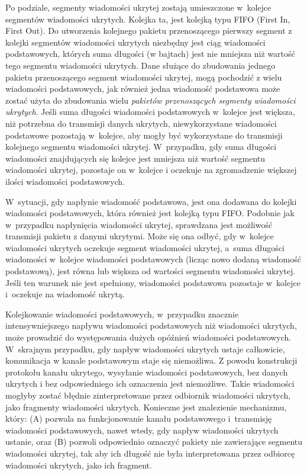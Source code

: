 \documentclass[a4paper, twoside, openright, 12pt]{report}
\begin{document}
    Po podziale, segmenty wiadomości ukrytej zostają umieszczone w~kolejce segmentów wiadomości
    ukrytych. Kolejka ta, jest kolejką typu FIFO (First In, First Out).
    Do utworzenia kolejnego pakietu przenoszącego pierwszy segment z kolejki
    segmentów wiadomości ukrytych niezbędny jest ciąg wiadomości podstawowych,
    których suma długości (w bajtach) jest nie mniejsza niż wartość tego segmentu wiadomości ukrytych.
    Dane służące do zbudowania
    jednego pakietu przenoszącego segment wiadomości ukrytej, mogą pochodzić z wielu wiadomości
    podstawowych, jak również jedna wiadomość podstawowa może zostać użyta do zbudowania
    wielu \emph{pakietów przenoszących segmenty wiadomości ukrytych}. Jeśli suma długości wiadomości
    podstawowych w~kolejce jest większa, niż potrzebna do transmisji danych ukrytych, niewykorzystane
    wiadomości podstawowe pozostają w~kolejce, aby mogły być wykorzystane do transmisji
    kolejnego segmentu wiadomości ukrytej.
    W~przypadku, gdy suma długości wiadomości znajdujących się kolejce jest mniejsza
    niż wartość segmentu wiadomości ukrytej, pozostaje on w~kolejce i oczekuje
    na zgromadzenie większej ilości wiadomości podstawowych.

    W~sytuacji, gdy napłynie wiadomość podstawowa, jest ona dodawana do kolejki
    wiadomości podstawowych, która również jest kolejką typu FIFO.
    Podobnie jak w~przypadku napłynięcia wiadomości ukrytej, sprawdzana jest możliwość
    transmisji pakietu z danymi ukrytymi. Może się ona odbyć, gdy w~kolejce wiadomości
    ukrytych oczekuje segment wiadomości ukrytej, a~suma długości wiadomości w~kolejce wiadomości
    podstawowych (licząc nowo dodaną wiadomość podstawową), jest równa lub większa
    od wartości segmentu wiadomości ukrytej. Jeśli ten warunek nie jest spełniony, wiadomości podstawowa
    pozostaje w~kolejce i~oczekuje na wiadomość ukrytą.

    Kolejkowanie wiadomości podstawowych, w~przypadku znacznie intensywniejszego
    napływu wiadomości podstawowych niż wiadomości ukrytych, może prowadzić do
    występowania dużych opóźnień wiadomości podstawowych. W~skrajnym przypadku,
    gdy napływ wiadomości ukrytych ustaje całkowicie, komunikacja w kanale podstawowym staje się niemożliwa.
    Z powodu konstrukcji protokołu kanału
    ukrytego, wysyłanie wiadomości podstawowych, bez danych ukrytych i bez odpowiedniego ich oznaczenia jest niemożliwe.
    Takie wiadomości mogłyby zostać błędnie zinterpretowane przez odbiornik wiadomości
    ukrytych, jako fragmenty wiadomości ukrytych. Konieczne jest znalezienie mechanizmu,
    który: (A) pozwala na funkcjonowanie kanału podstawowego i~transmisję wiadomości
    podstawowych, nawet wtedy, gdy napływ wiadomości ukrytych ustanie, oraz (B)
    pozwoli odpowiednio oznaczyć pakiety nie zawierające segmentu wiadomości ukrytej, tak aby ich długość
    nie była interpretowana przez odbiorcę wiadomości ukrytych, jako ich fragment.
\end{document}
